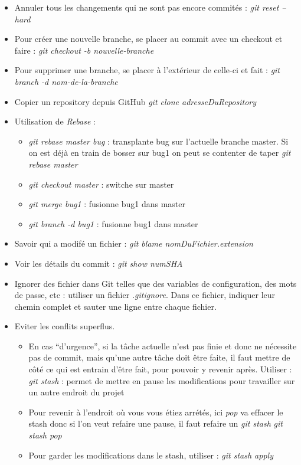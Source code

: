 \documentclass[12pt,a4paper]{article}
\begin{document}
\begin{itemize}
\item Annuler tous les changements qui ne sont pas encore commités :
\newline \textit{git reset --hard}
\item Pour créer une nouvelle branche, se placer au commit avec un checkout et faire :
\newline \textit{git checkout -b nouvelle-branche}
\item Pour supprimer une branche, se placer à l'extérieur de celle-ci et fait :
\textit{git branch -d nom-de-la-branche}
\item Copier un repository depuis GitHub
\newline \textit{git clone adresseDuRepository}
\item Utilisation de \textit{Rebase} :
\begin{itemize}
\item \textit{git rebase master bug} : transplante bug sur l'actuelle branche master. Si on est déjà en train de bosser sur bug1 on peut se contenter de taper \textit{git rebase master}
\item \textit{git checkout master} : switche sur master
\item \textit{git merge bug1} : fusionne bug1 dans master
\item \textit{git branch -d bug1} : fusionne bug1 dans master
\end{itemize}
\item Savoir qui a modifé un fichier :
\newline \textit{git blame nomDuFichier.extension}
\item Voir les détails du commit :
\newline \textit{git show numSHA}
\item Ignorer des fichier dans Git telles que des variables de configuration, des mots de passe, etc : 
\newline utiliser un fichier \textit{.gitignore}. Dans ce fichier, indiquer leur chemin complet et sauter une ligne entre chaque fichier.
\item Eviter les conflits superflus. 
\begin{itemize} 
\item En cas “d’urgence”, si la tâche actuelle n’est pas finie et donc ne nécessite pas de commit, mais qu’une autre tâche doit être faite, il faut mettre de côté ce qui est entrain d’être fait, pour pouvoir y revenir après. Utiliser :
\newline \textit{git stash} : permet de mettre en pause les modifications pour travailler sur un autre endroit du projet
\item Pour revenir à l'endroit où vous vous étiez arrétés, ici \textit{pop} va effacer le stash donc si l'on veut refaire une pause, il faut refaire un \textit{git stash}
\newline \textit{git stash pop}
\item Pour garder les modifications dans le stash, utiliser :
\newline \textit{git stash apply}
\end{itemize}
\end{itemize}
\end{document}
